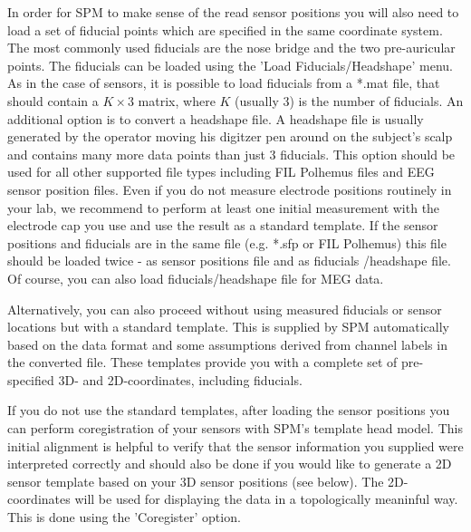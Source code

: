 In order for SPM to make sense of the read sensor positions you will
also need to load a set of fiducial points which are specified in the
same 
coordinate system. The most commonly used fiducials are the nose
bridge and the two pre-auricular points. The fiducials can be loaded
using the 'Load Fiducials/Headshape' menu. As in the case of sensors,
it is possible to load fiducials from a *.mat file, that should
contain a $K \times 3$ matrix, where $K$ (usually 3) is the number of
fiducials. An additional option is to convert a headshape file. A
headshape file is usually generated by the operator moving his
digitzer pen around on the subject's scalp and contains many more data 
points than just 3 fiducials. This option should be used for all other
supported file types including FIL Polhemus files and EEG sensor
position files. Even if you do not
measure electrode positions routinely in your lab, we recommend to
perform at least one initial measurement with the electrode cap you
use and use the result as a standard template. If the sensor positions
and fiducials are in the same file (e.g. *.sfp or FIL Polhemus) this
file should be loaded twice - as sensor positions file and as
fiducials /headshape file. Of course, you can also load
fiducials/headshape file for MEG data.

Alternatively, you can also proceed without using measured fiducials
or sensor locations but with a standard template. This is supplied by
SPM automatically based on the data format and some assumptions
derived from channel labels in the converted file. These templates
provide you with a complete set of pre-specified 3D- and
2D-coordinates, including fiducials.

If you do not use the standard templates, after loading the sensor
positions you can perform coregistration of your sensors with SPM's
template head model. This initial alignment is helpful to verify that
the sensor information you supplied were interpreted correctly and
should also be done if you would like to generate a 2D sensor template
based on your 3D sensor positions (see below). The 2D-coordinates will
be used for displaying the data in a topologically meaninful way. This
is done using the 'Coregister' option.

